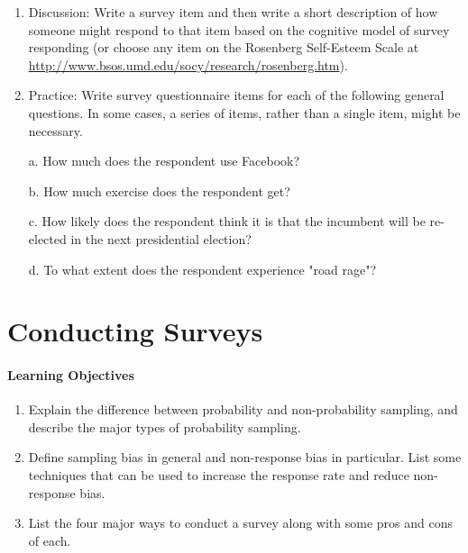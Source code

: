 \begin{fullwidth}

\begin{enumerate}

\item  Discussion: Write a survey item and then write a short description of how someone might respond to that item based on the cognitive model of survey responding (or choose any item on the Rosenberg Self-Esteem Scale at \url{http://www.bsos.umd.edu/socy/research/rosenberg.htm}).

\item Practice: Write survey questionnaire items for each of the following general questions. In some cases, a series of items, rather than a single item, might be necessary.

a. How much does the respondent use Facebook?

b. How much exercise does the respondent get?

c. How likely does the respondent think it is that the incumbent will be re-elected in the next presidential election?

d. To what extent does the respondent experience "road rage"?


\end{enumerate}

\end{fullwidth}

\newpage
\section{Conducting Surveys}


\paragraph{Learning Objectives}
 \begin{enumerate}
 \item  Explain the difference between probability and non-probability sampling, and describe the major types of probability sampling.
 \item Define sampling bias in general and non-response bias in particular. List some techniques that can be used to increase the response rate and reduce non-response bias.
 \item List the four major ways to conduct a survey along with some pros and cons of each.


   \end{enumerate}


